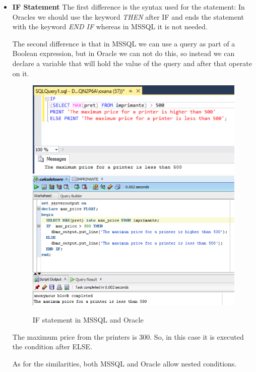 \begin{itemize}
  \item \textbf{IF Statement}\newline
The first difference is the syntax used for the statement: In Oracles we should use the keyword \textit{THEN} after IF and ends the statement with the keyword \textit{END IF} whereas in MSSQL it is not needed.

The second difference is that in  MSSQL we can use a query as part of a Boolean expression, but in Oracle we can not do this, so instead we can declare a variable that will hold the value of the query and after that operate on it.

\begin{figure}[ht!]
    \centering
	\includegraphics{images/example1-IF.png}
    \includegraphics[scale=0.8]{images/example2-IF.png}
    \caption{IF statement in MSSQL and Oracle}
    \label{fig1}
\end{figure}

The maximum price from the printers is 300. So, in this case it is executed the condition after ELSE.

As for the similarities, both MSSQL and Oracle allow nested conditions.


\end{itemize}
